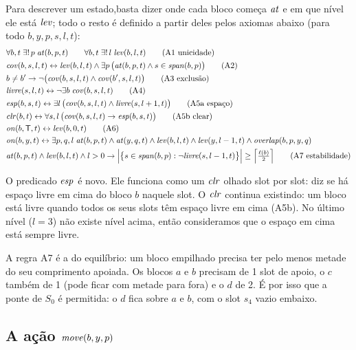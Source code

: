 \noindent Para descrever um estado,basta dizer onde cada bloco começa $\mathit{at}$ e em que nível ele está $\mathit{lev}$; todo o resto é
definido a partir deles pelos axiomas abaixo (para todo $b,y,p,s,l,t$):
\begin{align}
	&\forall b,t\;\exists!\,p\;\mathit{at}(b,p,t) \qquad \forall b,t\;\exists!\,l\;\mathit{lev}(b,l,t)
	\tag{A1 unicidade}\\
	&\mathit{cov}(b,s,l,t) \leftrightarrow \mathit{lev}(b,l,t)\land\exists p\,
	\bigl(\mathit{at}(b,p,t)\land s\in\mathit{span}(b,p)\bigr) \tag{A2}\\
	&b\neq b' \rightarrow \lnot\bigl(\mathit{cov}(b,s,l,t)\land\mathit{cov}(b',s,l,t)\bigr)
	\tag{A3 exclusão}\\
	&\mathit{livre}(s,l,t) \leftrightarrow \lnot\exists b\;\mathit{cov}(b,s,l,t) \tag{A4}\\
	&\mathit{esp}(b,s,t) \leftrightarrow \exists l\,\bigl(\mathit{cov}(b,s,l,t)\land
	\mathit{livre}(s,l+1,t)\bigr) \tag{A5a espaço}\\
	&\mathit{clr}(b,t) \leftrightarrow \forall s,l\,\bigl(\mathit{cov}(b,s,l,t)\rightarrow
	\mathit{esp}(b,s,t)\bigr) \tag{A5b clear}\\
	&\mathit{on}(b,\mathsf{T},t) \leftrightarrow \mathit{lev}(b,0,t) \tag{A6}\\
	&\mathit{on}(b,y,t) \leftrightarrow \exists p,q,l\;\mathit{at}(b,p,t)\land\mathit{at}(y,q,t)\land
	\mathit{lev}(b,l,t)\land\mathit{lev}(y,l-1,t)\land\mathit{overlap}(b,p,y,q) \notag\\
	&\mathit{at}(b,p,t)\land\mathit{lev}(b,l,t)\land l>0 \rightarrow
	\Bigl|\bigl\{s\in\mathit{span}(b,p):\lnot\mathit{livre}(s,l-1,t)\bigr\}\Bigr|
	\ge\Bigl\lceil\tfrac{\ell(b)}{2}\Bigr\rceil \tag{A7 estabilidade}
\end{align}

O predicado $\mathit{esp}$ é novo. Ele funciona como um $\mathit{clr}$ olhado slot por slot: diz se
há espaço livre em cima do bloco $b$ naquele slot. O $\mathit{clr}$ continua existindo: um
bloco está livre quando todos os seus slots têm espaço livre em cima (A5b). No último
nível ($l=3$) não existe nível acima, então consideramos que o espaço em cima está
sempre livre.

A regra A7 é a do equilíbrio: um bloco empilhado precisa ter pelo menos metade do
seu comprimento apoiada. Os blocos $a$ e $b$ precisam de 1 slot de apoio, o $c$
também de 1 (pode ficar com metade para fora) e o $d$ de 2. É por isso que a ponte
de $S_0$ é permitida: o $d$ fica sobre $a$ e $b$, com o slot $s_4$ vazio embaixo.


\subsection{A ação \texorpdfstring{$\mathit{move}(b,y,p)$}{move(b,y,p)}}

